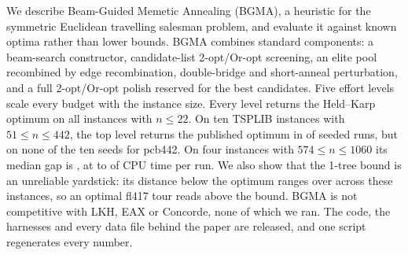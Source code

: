 We describe Beam-Guided Memetic Annealing (BGMA), a heuristic for the symmetric Euclidean travelling
salesman problem, and evaluate it against known optima rather than lower bounds. BGMA combines
standard components: a beam-search constructor, candidate-list 2-opt/Or-opt screening, an elite pool
recombined by edge recombination, double-bridge and short-anneal perturbation, and a full
2-opt/Or-opt polish reserved for the best candidates. Five effort levels scale every budget with the
instance size. Every level returns the Held--Karp optimum on all  instances with
$n\le 22$. On ten TSPLIB instances with $51\le n\le 442$, the top level returns the published optimum
in  of  seeded runs, but on none of the ten seeds for pcb442. On four
instances with $574\le n\le 1060$ its median gap is , at  to
 of CPU time per run.  We also show that the 1-tree
bound is an unreliable yardstick: its distance below the optimum ranges over 
across these instances, so an optimal fl417 tour reads  above the bound. BGMA is
not competitive with LKH, EAX or Concorde, none of which we ran. The code, the harnesses and every data
file behind the paper are released, and one script regenerates every number.
